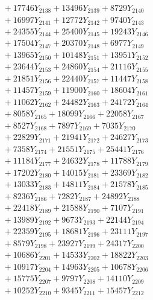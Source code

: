 \documentclass[a4paper,10pt]{article}
\begin{document}
{\begin{align}
&\;  + 17746 Y_{2138} + 13496 Y_{2139} + 8729 Y_{2140} \\[0.3ex]
&\;  + 16997 Y_{2141} + 12772 Y_{2142} + 9740 Y_{2143} \\[0.3ex]
&\;  + 24355 Y_{2144} + 25400 Y_{2145} + 19243 Y_{2146} \\[0.3ex]
&\;  + 17504 Y_{2147} + 20370 Y_{2148} + 6977 Y_{2149} \\[0.3ex]
&\;  + 13965 Y_{2150} + 10148 Y_{2151} + 13951 Y_{2152} \\[0.3ex]
&\;  + 23644 Y_{2153} + 24860 Y_{2154} + 21116 Y_{2155} \\[0.3ex]
&\;  + 21851 Y_{2156} + 22440 Y_{2157} + 11447 Y_{2158} \\[0.5ex]\allowbreak
&\;  + 11457 Y_{2159} + 11900 Y_{2160} + 18604 Y_{2161} \\[0.3ex]
&\;  + 11062 Y_{2162} + 24482 Y_{2163} + 24172 Y_{2164} \\[0.3ex]
&\;  + 8058 Y_{2165} + 18099 Y_{2166} + 22058 Y_{2167} \\[0.3ex]
&\;  + 8527 Y_{2168} + 7897 Y_{2169} + 7035 Y_{2170} \\[0.3ex]
&\;  + 22829 Y_{2171} + 21941 Y_{2172} + 24627 Y_{2173} \\[0.3ex]
&\;  + 7358 Y_{2174} + 21551 Y_{2175} + 25441 Y_{2176} \\[0.3ex]
&\;  + 11184 Y_{2177} + 24632 Y_{2178} + 11788 Y_{2179} \\[0.3ex]
&\;  + 17202 Y_{2180} + 14015 Y_{2181} + 23369 Y_{2182} \\[0.3ex]
&\;  + 13033 Y_{2183} + 14811 Y_{2184} + 21578 Y_{2185} \\[0.3ex]
&\;  + 8236 Y_{2186} + 7282 Y_{2187} + 24892 Y_{2188} \\[0.5ex]\allowbreak
&\;  + 22418 Y_{2189} + 21588 Y_{2190} + 7107 Y_{2191} \\[0.3ex]
&\;  + 13989 Y_{2192} + 9673 Y_{2193} + 22144 Y_{2194} \\[0.3ex]
&\;  + 22359 Y_{2195} + 18681 Y_{2196} + 23111 Y_{2197} \\[0.3ex]
&\;  + 8579 Y_{2198} + 23927 Y_{2199} + 24317 Y_{2200} \\[0.3ex]
&\;  + 10686 Y_{2201} + 14533 Y_{2202} + 18822 Y_{2203} \\[0.3ex]
&\;  + 10917 Y_{2204} + 14963 Y_{2205} + 10678 Y_{2206} \\[0.3ex]
&\;  + 15775 Y_{2207} + 9797 Y_{2208} + 14110 Y_{2209} \\[0.3ex]
&\;  + 10252 Y_{2210} + 9345 Y_{2211} + 15457 Y_{2212} \\[0.3ex]

\end{align}}
\end{document}
